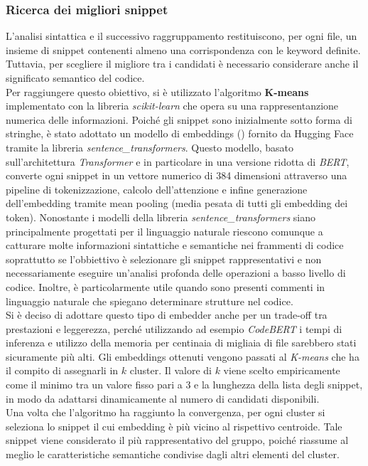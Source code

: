 \documentclass{article}
\begin{document}
\subsubsection{Ricerca dei migliori snippet}
L'analisi sintattica e il successivo raggruppamento restituiscono, per ogni file, un insieme di snippet contenenti almeno una corrispondenza con le keyword definite. Tuttavia, per scegliere il migliore tra i candidati è necessario considerare anche il significato semantico del codice.\\
Per raggiungere questo obiettivo, si è utilizzato l'algoritmo \textbf{K-means} implementato con la libreria \textit{scikit-learn}\cite{scikit-learn} che opera su una rappresentanzione numerica delle informazioni. Poiché gli snippet sono inizialmente sotto forma di stringhe, è stato adottato un modello di embeddings (\cite{all-MiniLM-L6-v2}) fornito da Hugging Face tramite la libreria \textit{sentence\_transformers}. Questo modello, basato sull’architettura \textit{Transformer} e in particolare in una versione ridotta di \textit{BERT}, converte ogni snippet in un vettore numerico di 384 dimensioni attraverso una pipeline di tokenizzazione, calcolo dell’attenzione e infine generazione dell’embedding tramite mean pooling (media pesata di tutti gli embedding dei token). Nonostante i modelli della libreria \textit{sentence\_transformers} siano principalmente progettati per il linguaggio naturale riescono comunque a catturare molte informazioni sintattiche e semantiche nei frammenti di codice soprattutto se l'obbiettivo è selezionare gli snippet rappresentativi e non necessariamente eseguire un'analisi profonda delle operazioni a basso livello di codice. Inoltre, è particolarmente utile quando sono presenti commenti in linguaggio naturale che spiegano determinare strutture nel codice.\\ 
Si è deciso di adottare questo tipo di embedder anche per un trade-off tra prestazioni e leggerezza, perché utilizzando ad esempio \textit{CodeBERT}\cite{feng2020codebertpretrainedmodelprogramming} i tempi di inferenza e utilizzo della memoria per centinaia di migliaia di file sarebbero stati sicuramente più alti. 
Gli embeddings ottenuti vengono passati al \textit{K-means} che ha il compito di assegnarli in $k$ cluster. Il valore di $k$ viene scelto empiricamente come il minimo tra un valore fisso pari a 3 e la lunghezza della lista degli snippet, in modo da adattarsi dinamicamente al numero di candidati disponibili.\\
Una volta che l'algoritmo ha raggiunto la convergenza, per ogni cluster si seleziona lo snippet il cui embedding è più vicino al rispettivo centroide. Tale snippet viene considerato il più rappresentativo del gruppo, poiché riassume al meglio le caratteristiche semantiche condivise dagli altri elementi del cluster.\\
\end{document}
